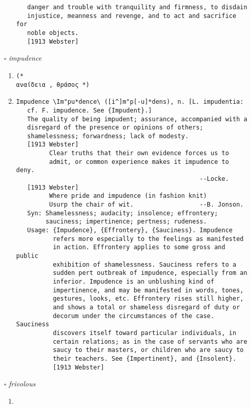 \documentclass{article}
\begin{document}
\begin{itemize}
\begin{enumerate}
{\begin{lstlisting}
   danger and trouble with tranquility and firmness, to disdain
   injustice, meanness and revenge, and to act and sacrifice for
   noble objects.
   [1913 Webster]
\end{lstlisting}}
\end{enumerate}
\item[$\square$] \emph{ impudence }
\begin{enumerate}
\item{
\begin{lstlisting}
(* 
αναίδεια , θράσος *)
\end{lstlisting}}
\item{
\begin{lstlisting}
Impudence \Im"pu*dence\ ([i^]m"p[-u]*dens), n. [L. impudentia:
   cf. F. impudence. See {Impudent}.]
   The quality of being impudent; assurance, accompanied with a
   disregard of the presence or opinions of others;
   shamelessness; forwardness; lack of modesty.
   [1913 Webster]
         Clear truths that their own evidence forces us to
         admit, or common experience makes it impudence to deny.
                                                  --Locke.
   [1913 Webster]
         Where pride and impudence (in fashion knit)
         Usurp the chair of wit.                  --B. Jonson.
   Syn: Shamelessness; audacity; insolence; effrontery;
        sauciness; impertinence; pertness; rudeness.
   Usage: {Impudence}, {Effrontery}, {Sauciness}. Impudence
          refers more especially to the feelings as manifested
          in action. Effrontery applies to some gross and public
          exhibition of shamelessness. Sauciness refers to a
          sudden pert outbreak of impudence, especially from an
          inferior. Impudence is an unblushing kind of
          impertinence, and may be manifested in words, tones,
          gestures, looks, etc. Effrontery rises still higher,
          and shows a total or shameless disregard of duty or
          decorum under the circumstances of the case. Sauciness
          discovers itself toward particular individuals, in
          certain relations; as in the case of servants who are
          saucy to their masters, or children who are saucy to
          their teachers. See {Impertinent}, and {Insolent}.
          [1913 Webster]
\end{lstlisting}}
\end{enumerate}
\item[$\square$] \emph{ frivolous }
\begin{enumerate}
\item{
}
\end{enumerate}
\end{itemize}
\end{document}
